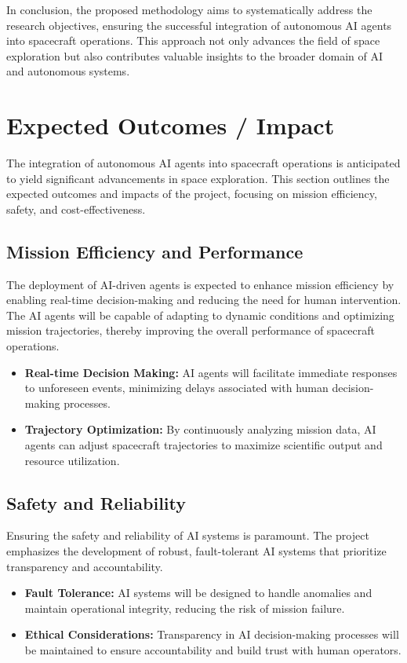 \documentclass[a4paper, 11pt]{article}
\begin{document}
In conclusion, the proposed methodology aims to systematically address the research objectives, ensuring the successful integration of autonomous AI agents into spacecraft operations. This approach not only advances the field of space exploration but also contributes valuable insights to the broader domain of AI and autonomous systems.
\section{Expected Outcomes / Impact}

The integration of autonomous AI agents into spacecraft operations is anticipated to yield significant advancements in space exploration. This section outlines the expected outcomes and impacts of the project, focusing on mission efficiency, safety, and cost-effectiveness.

\subsection{Mission Efficiency and Performance}

The deployment of AI-driven agents is expected to enhance mission efficiency by enabling real-time decision-making and reducing the need for human intervention. The AI agents will be capable of adapting to dynamic conditions and optimizing mission trajectories, thereby improving the overall performance of spacecraft operations. 

\begin{itemize}
    \item \textbf{Real-time Decision Making:} AI agents will facilitate immediate responses to unforeseen events, minimizing delays associated with human decision-making processes.
    \item \textbf{Trajectory Optimization:} By continuously analyzing mission data, AI agents can adjust spacecraft trajectories to maximize scientific output and resource utilization.
\end{itemize}

\subsection{Safety and Reliability}

Ensuring the safety and reliability of AI systems is paramount. The project emphasizes the development of robust, fault-tolerant AI systems that prioritize transparency and accountability. 

\begin{itemize}
    \item \textbf{Fault Tolerance:} AI systems will be designed to handle anomalies and maintain operational integrity, reducing the risk of mission failure.
    \item \textbf{Ethical Considerations:} Transparency in AI decision-making processes will be maintained to ensure accountability and build trust with human operators.
\end{itemize}
\end{document}
